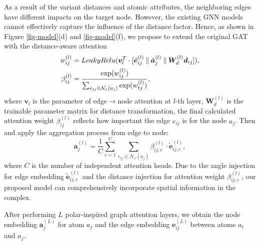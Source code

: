 \documentclass[sigconf]{acmart}
\newcommand{\cat}{\ensuremath{\mathbin\Vert}}
\begin{document}
As a result of the variant distances and atomic attributes, the neighboring edges have different impacts on the target node. However, the existing GNN models cannot effectively capture the influence of the distance factor. Hence, as shown in Figure \ref{fig-model}(d) and \ref{fig-model}(f), we propose to extend the original GAT \cite{velivckovic2018graph} with the distance-aware attention 
\begin{align}
\label{eq-e2a-attn}
    w^{(l)}_{ij} &= LeakyRelu(\bm{v}^T_{l} \cdot [\tilde{\bm{e}}^{(l)}_{ij} \cat \tilde{\bm{a}}^{(l)}_{j} \cat \bm{W}^{(l)}_d \bm{d}_{ij}]),
    \\
    \beta^{(l)}_{ij} &= \frac{{\rm exp}(w^{(l)}_{ij})}{\sum_{e_{tj} \in \mathcal{N}_{e}(a_{j})} {\rm exp}(w^{(l)}_{tj})},
\end{align}
where $\bm{v}_{l}$ is the parameter of edge$\rightarrow$node attention at $l$-th layer, $\bm{W}^{(l)}_d$ is the trainable parameter matrix for distance transformation, the final calculated attention weight $\beta^{(l)}_{ij}$ reflects how important the edge $e_{ij}$ is for the node $a_j$. Then  and apply the aggregation process from edge to node:
\begin{equation}
\label{eq-e2a}
    \bm{a}^{(l)}_{j} = \frac{1}{C} \sum_{c=1}^{C} \sum_{e_{ij} \in \mathcal{N}_{e}(a_{j})} \beta^{(l)}_{ij,c} \cdot \tilde{\bm{e}}^{(l)}_{ij,c},
\end{equation}
where $C$ is the number of independent attention heads. Due to the angle injection for edge embedding $\tilde{\bm{e}}^{(l)}_{ij,c}$ and the distance injection for attention weight $\beta^{(l)}_{ij,c}$, our proposed model can comprehensively incorporate spatial information in the complex.

After performing $L$ polar-inspired graph attention layers, we obtain the node embedding $\bm{a}^{(L)}_{j}$ for atom $a_j$ and the edge embedding $\bm{e}^{(L)}_{ij}$ between atoms $a_i$ and $a_j$.
\end{document}
